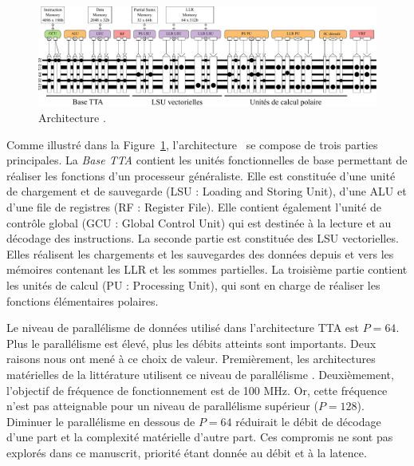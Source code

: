 \begin{figure}[t]
	\centering
	\includegraphics[width=\textwidth]{main/ch4_fig/archi_sc}
	\caption{Architecture \TTSC.}
	\label{fig:prode}
\end{figure}

Comme illustré dans la Figure~\ref{fig:prode}, l'architecture \TTSC~se compose de trois parties principales. La \textit{Base TTA} contient les unités fonctionnelles de base permettant de réaliser les fonctions d'un processeur généraliste. Elle est constituée d'une unité de chargement et de sauvegarde (LSU : Loading and Storing Unit), d'une ALU et d'une file de registres (RF : Register File). Elle contient également l'unité de contrôle global (GCU : Global Control Unit) qui est destinée à la lecture et au décodage des instructions. La seconde partie est constituée des LSU vectorielles. Elles réalisent les chargements et les sauvegardes des données depuis et vers les mémoires contenant les LLR et les sommes partielles.
La troisième partie contient les unités de calcul (PU : Processing Unit), qui sont en charge de réaliser les fonctions élémentaires polaires.

Le niveau de parallélisme de données utilisé dans l'architecture TTA est $P=64$. Plus le parallélisme est élevé, plus les débits atteints sont importants. Deux raisons nous ont mené à ce choix de valeur. Premièrement, les architectures matérielles de la littérature utilisent ce niveau de parallélisme \cite{sarkis_fast_2014,giard_polarbear:_2017,mishra_successive_2012,giard_638_2015}. Deuxièmement, l'objectif de fréquence de fonctionnement est de 100 MHz. Or, cette fréquence n'est pas atteignable pour un niveau de parallélisme supérieur ($P=128$). Diminuer le parallélisme en dessous de $P=64$ réduirait le débit de décodage d'une part et la complexité matérielle d'autre part. Ces compromis ne sont pas explorés dans ce manuscrit, priorité étant donnée au débit et à la latence.

